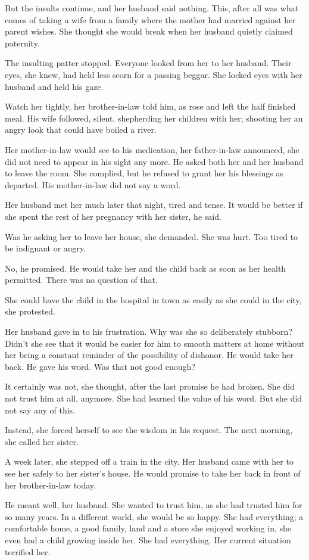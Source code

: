 \documentclass{article}
\begin{document}
But the insults continue, and her husband said nothing. This, after all was what comes of taking a wife from a family where the mother had married against her parent wishes. She thought she would break when her husband quietly claimed paternity. 

The insulting patter stopped. Everyone looked from her to her husband. Their  eyes, she knew, had held less scorn for a passing beggar. She locked eyes with her husband and held his gaze.

Watch her tightly, her brother-in-law told him, as rose and left the half finished meal. His wife followed, silent, shepherding her children with her; shooting her an angry look that could have boiled a river. 

Her mother-in-law would see to his medication, her father-in-law announced, she did not need to appear in his sight any more. He asked both her and her husband to leave the room. She complied, but he refused to grant her his blessings as departed. His mother-in-law did not say a word.

Her husband met her much later that night, tired and tense. It would be better if she spent the rest of her pregnancy with her sister, he said.

Was he asking her to leave her house, she demanded. She was hurt. Too tired to be indignant or angry.

No, he promised. He would take her and the child back as soon as her health permitted. There was no question of that. 

She could have the child in the hospital in town as easily as she could in the city, she protested.

Her husband gave in to his frustration. Why was she so deliberately stubborn? Didn't she see that it would be easier for him to smooth matters at home without her being a constant reminder of the possibility of dishonor. He would take her back. He gave his word. Was that not good enough?

It certainly was not, she thought, after the last promise he had broken. She did not trust him at all, anymore. She had learned the value of his word. But she did not say any of this.

Instead, she forced herself to see the wisdom in his request. The next morning, she called her sister.

A week later, she stepped off a train in the city. Her husband came with her to see her safely to her sister's house. He would promise to take her back in front of her brother-in-law today.

He meant well, her husband. She wanted to trust him, as she had trusted him for so many years. In a different world, she would be so happy. She had everything; a comfortable home, a good family, land and a store she enjoyed working in, she even had a child growing inside her. She had everything. Her current situation terrified her.


 
\end{document}
